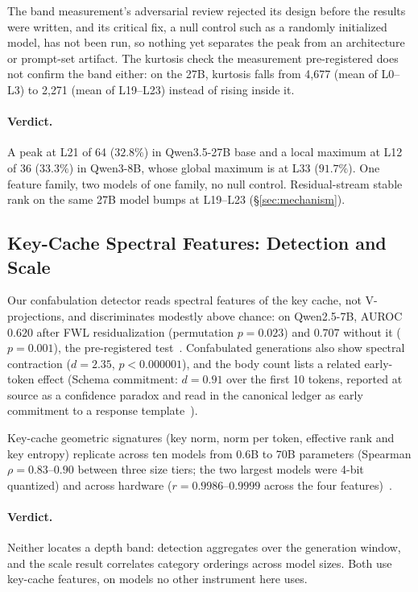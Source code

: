 \documentclass[11pt,a4paper]{article}
\begin{document}
The band measurement's adversarial review rejected its design before the
results were written, and its critical fix, a null control such as a
randomly initialized model, has not been run, so nothing yet separates
the peak from an architecture or prompt-set artifact. The kurtosis check
the measurement pre-registered does not confirm the band either: on the
27B, kurtosis falls from 4{,}677 (mean of L0--L3) to 2{,}271 (mean of
L19--L23) instead of rising inside it.

\paragraph{Verdict.} A peak at L21 of 64 ($32.8\%$) in Qwen3.5-27B base
and a local maximum at L12 of 36 ($33.3\%$) in Qwen3-8B, whose global
maximum is at L33 ($91.7\%$). One feature family, two models of one
family, no null control. Residual-stream stable rank on the same 27B
model bumps at L19--L23 (\S\ref{sec:mechanism}).



\subsection{Key-Cache Spectral Features: Detection and Scale}
\label{sec:keycache}

Our confabulation detector reads spectral features of the key cache, not
V-projections, and discriminates modestly above chance: on Qwen2.5-7B,
AUROC $0.620$ after FWL residualization (permutation $p = 0.023$) and
$0.707$ without it ($p = 0.001$), the pre-registered
test~\citep{lyra2026oracle}. Confabulated generations also show
spectral contraction ($d{=}2.35$, $p{<}0.000001$), and the body count
lists a related early-token effect (Schema commitment: $d{=}0.91$ over
the first 10 tokens, reported at source as a confidence paradox and read
in the canonical ledger as early commitment to a response
template~\citep{lyra2026metapattern}).

Key-cache geometric signatures (key norm, norm per token, effective rank and
key entropy) replicate across ten models from $0.6$B to $70$B parameters
(Spearman $\rho = 0.83$--$0.90$ between three size tiers; the two largest
models were 4-bit quantized) and across hardware
($r = 0.9986$--$0.9999$ across the four features)~\citep{lyra2026campaign2}.

\paragraph{Verdict.} Neither locates a depth band: detection aggregates
over the generation window, and the scale result correlates category
orderings across model sizes. Both use key-cache features, on models no
other instrument here uses.
\end{document}
